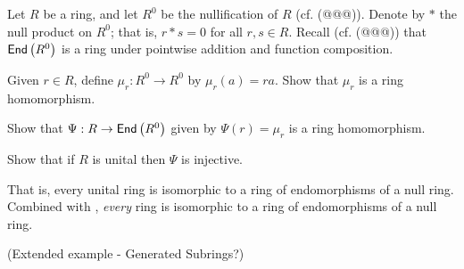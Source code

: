 \begin{exercise}
Let \(R\) be a ring, and let \(R^0\) be the nullification of \(R\) (cf. (@@@)). Denote by \(\ast\) the null product on \(R^0\); that is, \(r \ast s = 0\) for all \(r,s \in R\). Recall (cf. (@@@)) that \( \mathsf{End}\left(R^0\right) \) is a ring under pointwise addition and function composition.
\begin{proplist}
\item Given \(r \in R\), define \(\mu_r : R^0 \rightarrow R^0\) by \(\mu_r(a) = ra\). Show that \(\mu_r\) is a ring homomorphism.
\item Show that \(\Psi : R \rightarrow  \mathsf{End}\left(R^0\right) \) given by \(\Psi(r) = \mu_r\) is a ring homomorphism.
\item Show that if \(R\) is unital then \(\Psi\) is injective.
\end{proplist}
That is, every unital ring is isomorphic to a ring of endomorphisms of a null ring. Combined with , \emph{every} ring is isomorphic to a ring of endomorphisms of a null ring.
\end{exercise}

(Extended example - Generated Subrings?)
